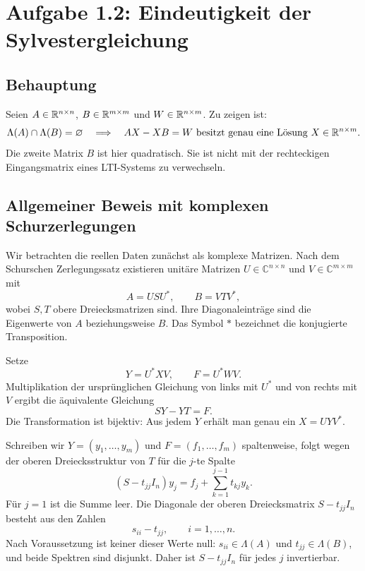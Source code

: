 \section{Aufgabe 1.2: Eindeutigkeit der Sylvestergleichung}\label{sec:sylvester}
\subsection{Behauptung}
Seien $A\in\mathbb{R}^{n\times n}$, $B\in\mathbb{R}^{m\times m}$ und $W\in\mathbb{R}^{n\times m}$. Zu zeigen ist:
\begin{equation}
 \Lambda(A)\cap\Lambda(B)=\varnothing
 \quad\Longrightarrow\quad
 AX-XB=W\text{ besitzt genau eine Lösung }X\in\mathbb{R}^{n\times m}.
\end{equation}
Die zweite Matrix $B$ ist hier quadratisch. Sie ist nicht mit der rechteckigen Eingangsmatrix eines LTI-Systems zu verwechseln.

\subsection{Allgemeiner Beweis mit komplexen Schurzerlegungen}
Wir betrachten die reellen Daten zunächst als komplexe Matrizen. Nach dem Schurschen Zerlegungssatz existieren unitäre Matrizen $U\in\mathbb C^{n\times n}$ und $V\in\mathbb C^{m\times m}$ mit
\begin{equation}
 A=USU^*,\qquad B=VTV^*,
\end{equation}
wobei $S,T$ obere Dreiecksmatrizen sind. Ihre Diagonaleinträge sind die Eigenwerte von $A$ beziehungsweise $B$. Das Symbol $*$ bezeichnet die konjugierte Transposition.

Setze
\begin{equation}
 Y=U^*XV,\qquad F=U^*WV.
\end{equation}
Multiplikation der ursprünglichen Gleichung von links mit $U^*$ und von rechts mit $V$ ergibt die äquivalente Gleichung
\begin{equation}\label{eq:schursylvester}
 SY-YT=F.
\end{equation}
Die Transformation ist bijektiv: Aus jedem $Y$ erhält man genau ein $X=UYV^*$.

Schreiben wir $Y=(y_1,\ldots,y_m)$ und $F=(f_1,\ldots,f_m)$ spaltenweise, folgt wegen der oberen Dreiecksstruktur von $T$ für die $j$-te Spalte
\begin{equation}\label{eq:columnrecursion}
 (S-t_{jj}I_n)y_j
 =f_j+\sum_{k=1}^{j-1}t_{kj}y_k.
\end{equation}
Für $j=1$ ist die Summe leer. Die Diagonale der oberen Dreiecksmatrix $S-t_{jj}I_n$ besteht aus den Zahlen
\begin{equation}
 s_{ii}-t_{jj},\qquad i=1,\ldots,n.
\end{equation}
Nach Voraussetzung ist keiner dieser Werte null: $s_{ii}\in\Lambda(A)$ und $t_{jj}\in\Lambda(B)$, und beide Spektren sind disjunkt. Daher ist $S-t_{jj}I_n$ für jedes $j$ invertierbar.

